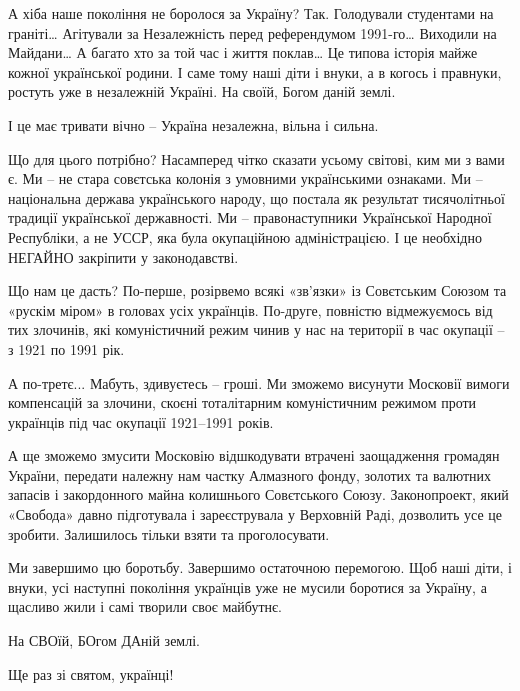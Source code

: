А хіба наше покоління не боролося за Україну? Так. Голодували студентами на
граніті… Агітували за Незалежність перед референдумом 1991-го…  Виходили на
Майдани… А багато хто за той час і життя поклав… Це типова історія майже кожної
української родини. І саме тому наші діти і внуки, а в когось і правнуки,
ростуть уже в незалежній Україні. На своїй, Богом даній землі.  

І це має тривати вічно – Україна незалежна, вільна і сильна.

Що для цього потрібно? Насамперед чітко сказати усьому світові, ким ми з вами
є. Ми – не стара совєтська колонія з умовними українськими ознаками. Ми –
національна держава українського народу, що постала як результат тисячолітньої
традиції української державності. Ми – правонаступники Української Народної
Республіки, а не УССР, яка була окупаційною адміністрацією. І це необхідно
НЕГАЙНО закріпити у законодавстві.

Що нам це дасть? По-перше, розірвемо всякі «зв’язки» із Совєтським Союзом та
«рускім міром» в головах усіх українців. По-друге, повністю відмежуємось від
тих злочинів, які комуністичний режим чинив у нас на території в час окупації –
з 1921 по 1991 рік.

А по-третє... Мабуть, здивуєтесь – гроші. Ми зможемо висунути Московії вимоги
компенсацій за злочини, скоєні тоталітарним комуністичним режимом проти
українців під час окупації 1921–1991 років.

А ще зможемо змусити Московію відшкодувати втрачені заощадження громадян
України, передати належну нам частку Алмазного фонду, золотих та валютних
запасів і закордонного майна колишнього Совєтського Союзу. Законопроект, який
«Свобода» давно підготувала і зареєструвала у Верховній Раді, дозволить усе це
зробити. Залишилось тільки взяти та проголосувати.

Ми завершимо цю боротьбу. Завершимо остаточною перемогою. Щоб наші діти, і
внуки, усі наступні покоління українців уже не мусили боротися за Україну, а
щасливо жили і самі творили своє майбутнє. 

На СВОїй, БОгом ДАній землі. 

Ще раз зі святом, українці!

